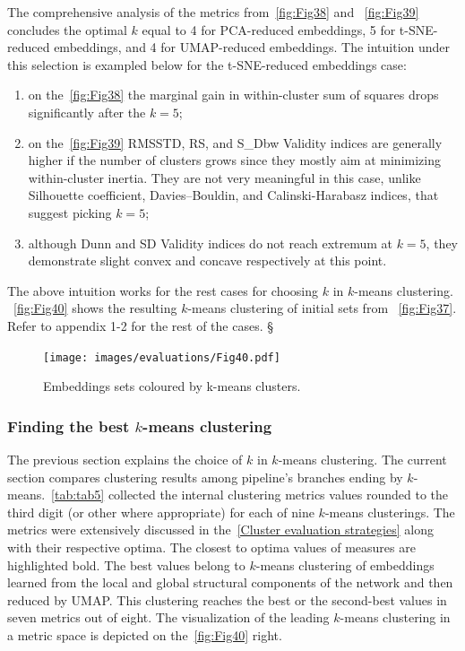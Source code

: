The comprehensive analysis of the metrics from~\autoref{fig:Fig38} and ~\autoref{fig:Fig39} concludes the optimal $k$ equal to 4 for PCA-reduced embeddings, 5 for t-SNE-reduced embeddings, and 4 for UMAP-reduced embeddings. The intuition under this selection is exampled below for the t-SNE-reduced embeddings case:
\begin{enumerate}
    \item on the~\autoref{fig:Fig38} the marginal gain in within-cluster sum of squares drops significantly after the $k = 5$;
    \item on the~\autoref{fig:Fig39} RMSSTD, RS, and S\_Dbw Validity indices are generally higher if the number of clusters grows since they mostly aim at minimizing within-cluster inertia. They are not very meaningful in this case, unlike Silhouette coefficient, Davies–Bouldin, and Calinski-Harabasz indices, that suggest picking $k = 5$;
    \item although Dunn and SD Validity indices do not reach extremum at $k = 5$, they demonstrate slight convex and concave respectively at this point.
\end{enumerate}
The above intuition works for the rest cases for choosing $k$ in $k$-means clustering. ~\autoref{fig:Fig40} shows the resulting $k$-means clustering of initial sets from ~\autoref{fig:Fig37}. Refer to appendix 1-2 for the rest of the cases.  §

\begin{figure}[!ht]
	\centering
	\texttt{[image: images/evaluations/Fig40.pdf]}\\
	\caption{Embeddings sets coloured by k-means clusters.}
	\label{fig:Fig40}
\end{figure}

\subsubsection{Finding the best $k$-means clustering}
\label{Finding the best $k$-means clustering}
The previous section explains the choice of $k$ in $k$-means clustering. The current section compares clustering results among pipeline's branches ending by $k$-means.~\autoref{tab:tab5} collected the internal clustering metrics values rounded to the third digit (or other where appropriate) for each of nine $k$-means clusterings. The metrics were extensively discussed in the~\ref{Cluster evaluation strategies} along with their respective optima. The closest to optima values of measures are highlighted bold. The best values belong to $k$-means clustering of embeddings learned from the local and global structural components of the network and then reduced by UMAP. This clustering reaches the best or the second-best values in seven metrics out of eight. The visualization of the leading $k$-means clustering in a metric space is depicted on the~\autoref{fig:Fig40} right.

